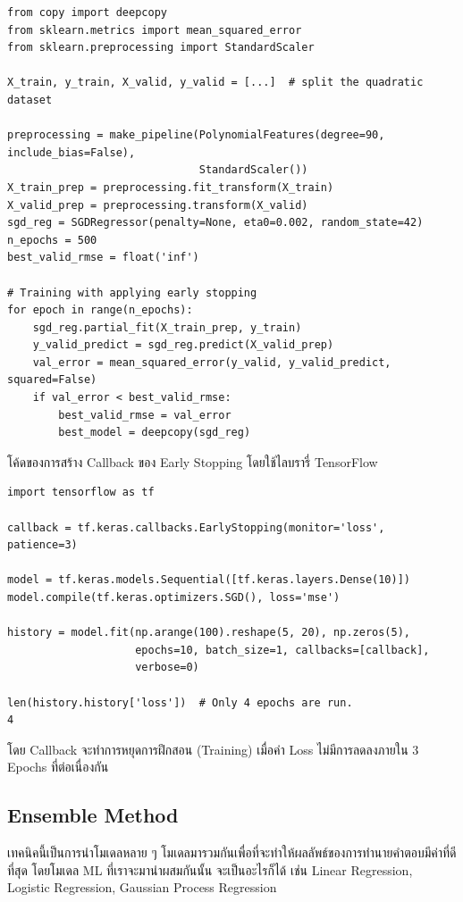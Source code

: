 \begin{lstlisting}[style=MyPython]
from copy import deepcopy
from sklearn.metrics import mean_squared_error
from sklearn.preprocessing import StandardScaler

X_train, y_train, X_valid, y_valid = [...]  # split the quadratic dataset

preprocessing = make_pipeline(PolynomialFeatures(degree=90, include_bias=False),
                              StandardScaler())
X_train_prep = preprocessing.fit_transform(X_train)
X_valid_prep = preprocessing.transform(X_valid)
sgd_reg = SGDRegressor(penalty=None, eta0=0.002, random_state=42)
n_epochs = 500
best_valid_rmse = float('inf')

# Training with applying early stopping
for epoch in range(n_epochs):
    sgd_reg.partial_fit(X_train_prep, y_train)
    y_valid_predict = sgd_reg.predict(X_valid_prep)
    val_error = mean_squared_error(y_valid, y_valid_predict, squared=False)
    if val_error < best_valid_rmse:
        best_valid_rmse = val_error
        best_model = deepcopy(sgd_reg)
\end{lstlisting}

\noindent โค้ดของการสร้าง Callback ของ Early Stopping โดยใช้ไลบรารี่ TensorFlow 

\begin{lstlisting}[style=MyPython]
import tensorflow as tf

callback = tf.keras.callbacks.EarlyStopping(monitor='loss', patience=3)

model = tf.keras.models.Sequential([tf.keras.layers.Dense(10)])
model.compile(tf.keras.optimizers.SGD(), loss='mse')

history = model.fit(np.arange(100).reshape(5, 20), np.zeros(5),
                    epochs=10, batch_size=1, callbacks=[callback],
                    verbose=0)

len(history.history['loss'])  # Only 4 epochs are run.
4
\end{lstlisting}

\noindent โดย Callback จะทำการหยุดการฝึกสอน (Training) เมื่อค่า Loss ไม่มีการลดลงภายใน 3 Epochs ที่ต่อเนื่องกัน

\subsection{Ensemble Method}
\label{ssec:ensemble_model}

เทคนิคนี้เป็นการนำโมเดลหลาย ๆ โมเดลมารวมกันเพื่อที่จะทำให้ผลลัพธ์ของการทำนายคำตอบมีค่าที่ดีที่สุด โดยโมเดล ML ที่เราจะมานำผสมกันนั้น%
จะเป็นอะไรก็ได้ เช่น Linear Regression, Logistic Regression, Gaussian Process Regression


